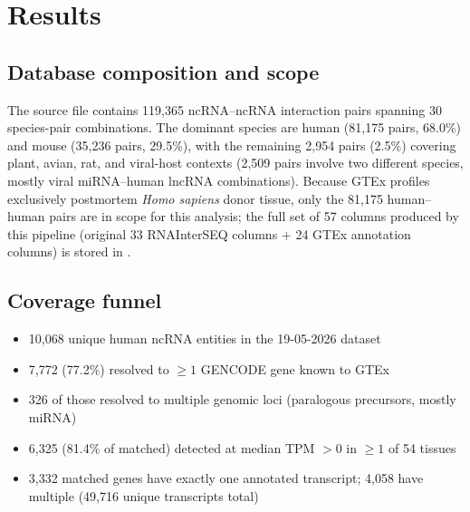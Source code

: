 \documentclass[11pt]{article}
\begin{document}
\section{Results}

\subsection{Database composition and scope}
\begin{sloppypar}
The source file contains 119,365 ncRNA--ncRNA interaction pairs spanning
30 species-pair combinations. The dominant species are human
(81,175 pairs, 68.0\%) and mouse (35,236 pairs, 29.5\%), with the
remaining 2,954 pairs (2.5\%) covering plant, avian, rat,
and viral-host contexts (2,509 pairs involve two different species, mostly
viral miRNA--human lncRNA combinations). Because GTEx profiles exclusively
postmortem \emph{Homo sapiens} donor tissue, only the 81,175 human--human
pairs are in scope for this analysis; the full set of 57 columns produced by
this pipeline (original 33 RNAInterSEQ columns $+$ 24 GTEx annotation columns)
is stored in .
\end{sloppypar}

\subsection{Coverage funnel}
\begin{itemize}
  \item 10,068 unique human ncRNA entities in the 19-05-2026 dataset
  \item 7,772 (77.2\%) resolved to $\geq 1$ GENCODE gene known to GTEx
  \item 326 of those resolved to multiple genomic loci (paralogous precursors, mostly miRNA)
  \item 6,325 (81.4\% of matched) detected at median TPM $>0$ in $\geq 1$ of 54 tissues
  \item 3,332 matched genes have exactly one annotated transcript; 4,058 have multiple (49,716 unique transcripts total)
\end{itemize}
\end{document}
